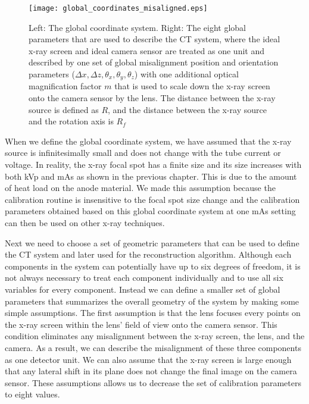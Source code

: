 \begin{figure}[ht]
\centering
\texttt{[image: global\_coordinates\_misaligned.eps]}
\label{fig:global_coord_misaligned}
\caption{Left: The global coordinate system.  Right: The eight global parameters that are used to describe the CT system, where the ideal x-ray screen and ideal camera sensor are treated as one unit and described by one set of global misalignment position and orientation parameters ($\Delta x, \Delta z, \theta_x, \theta_y, \theta_z$) with one additional optical magnification factor $m$ that is used to scale down the x-ray screen onto the camera sensor by the lens.  The distance between the x-ray source is defined as $R$, and the distance between the x-ray source and the rotation axis is $R_f$}
\end{figure}

When we define the global coordinate system, we have assumed that the x-ray source is infinitesimally small and does not change with the tube current or voltage.  In reality, the x-ray focal spot has a finite size and its size increases with both kVp and mAs as shown in the previous chapter.  This is due to the amount of heat load on the anode material. We made this assumption because the calibration routine is insensitive to the focal spot size change and the calibration parameters obtained based on this global coordinate system at one mAs setting can then be used on other x-ray techniques. 

Next we need to choose a set of geometric parameters that can be used to define the CT system and later used for the reconstruction algorithm.  Although each components in the system can potentially have up to six degrees of freedom, it is not always necessary to treat each component individually and to use all six variables for every component.  Instead we can define a smaller set of global parameters that summarizes the overall geometry of the system by making some simple assumptions.  The first assumption is that the lens focuses every points on the x-ray screen within the lens' field of view onto the camera sensor.  This condition eliminates any misalignment between the x-ray screen, the lens, and the camera.  As a result, we can describe the misalignment of these three components as one detector unit.  We can also assume that the x-ray screen is large enough that any lateral shift in its plane does not change the final image on the camera sensor.  These assumptions allows us to decrease the set of calibration parameters to eight values.

